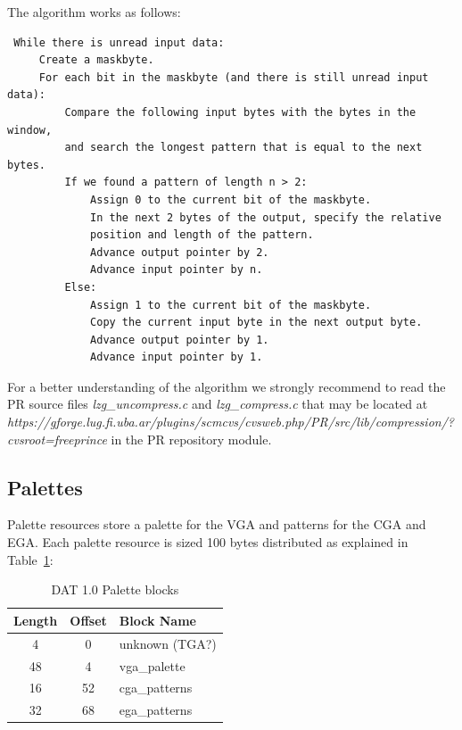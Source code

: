 \documentclass{article}
\begin{document}
\pagebreak[2]
 The algorithm works as follows:\\
\begin{verbatim}
 While there is unread input data:
     Create a maskbyte.
     For each bit in the maskbyte (and there is still unread input data):
         Compare the following input bytes with the bytes in the window,
         and search the longest pattern that is equal to the next bytes.
         If we found a pattern of length n > 2:
             Assign 0 to the current bit of the maskbyte.
             In the next 2 bytes of the output, specify the relative
             position and length of the pattern.
             Advance output pointer by 2.
             Advance input pointer by n.
         Else:
             Assign 1 to the current bit of the maskbyte.
             Copy the current input byte in the next output byte.
             Advance output pointer by 1.
             Advance input pointer by 1.
\end{verbatim}
\pagebreak[2]

 For a better understanding of the algorithm we strongly recommend to read
 the   PR source files {\it lzg\_uncompress.c} and {\it lzg\_compress.c} that may be
 located at {\it https://gforge.lug.fi.uba.ar/plugins/scmcvs/cvsweb.php/PR/src/lib/compression/?cvsroot=freeprince}
 in the PR repository module.

\subsection{Palettes}
 Palette resources store a palette for the  VGA and patterns for the  CGA and
  EGA. Each palette resource is sized 100 bytes distributed as explained in Table~\ref{palettes table}:

\begin{center}
\begin{table}
\begin{tabular}{ccl}
\hline
  Length & Offset & Block Name \\
\hline
  4     & 0      & unknown (TGA?) \\
  48    & 4      & vga\_palette \\
  16    & 52     & cga\_patterns \\
  32    & 68     & ega\_patterns \\
\hline
\end{tabular}
\caption{DAT 1.0 Palette blocks}
\label{palettes table}
\end{table}
\end{center}
\end{document}
